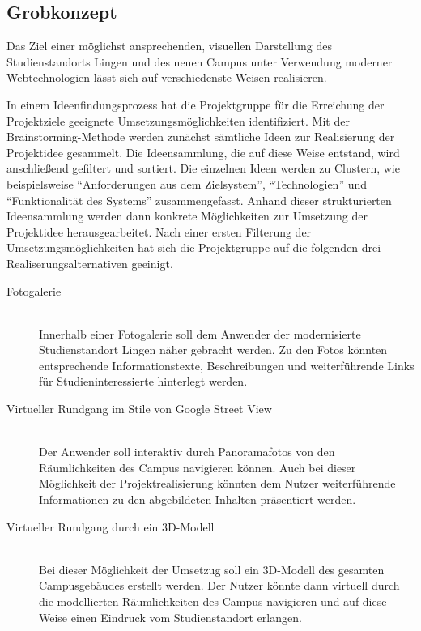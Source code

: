 \subsection{Grobkonzept}
\label{sec:Grobkonzept}

Das Ziel einer möglichst ansprechenden, visuellen Darstellung des
Studienstandorts Lingen und des neuen Campus unter Verwendung moderner
Webtechnologien lässt sich auf verschiedenste Weisen realisieren. 

In einem Ideenfindungsprozess hat die Projektgruppe für die Erreichung der
Projektziele geeignete Umsetzungsmöglichkeiten identifiziert. Mit der
Brainstorming-Methode werden zunächst sämtliche Ideen zur Realisierung der
Projektidee gesammelt. Die Ideensammlung, die auf diese Weise entstand, wird
anschließend gefiltert und sortiert. Die einzelnen Ideen werden zu Clustern, wie
beispielsweise "`Anforderungen aus dem Zielsystem"', "`Technologien"' und
"`Funktionalität des Systems"' zusammengefasst. Anhand dieser strukturierten
Ideensammlung werden dann konkrete Möglichkeiten zur Umsetzung der Projektidee
herausgearbeitet. Nach einer ersten Filterung der Umsetzungsmöglichkeiten hat
sich die Projektgruppe auf die folgenden drei Realiserungsalternativen geeinigt. 

\begin{description}
\item[Fotogalerie] \hfill \\
Innerhalb einer Fotogalerie soll dem Anwender der modernisierte Studienstandort
Lingen näher gebracht werden. Zu den Fotos könnten entsprechende
Informationstexte, Beschreibungen und weiterführende Links für
Studieninteressierte hinterlegt werden.

\item[Virtueller Rundgang im Stile von Google Street View] \hfill \\
Der Anwender soll interaktiv durch Panoramafotos von den Räumlichkeiten des
Campus navigieren können. Auch bei dieser Möglichkeit der Projektrealisierung
könnten dem Nutzer weiterführende Informationen zu den abgebildeten Inhalten
präsentiert werden.

\item[Virtueller Rundgang durch ein 3D-Modell] \hfill \\
Bei dieser Möglichkeit der Umsetzug soll ein 3D-Modell des gesamten
Campusgebäudes erstellt werden. Der Nutzer könnte dann virtuell durch die
modellierten Räumlichkeiten des Campus navigieren und auf diese Weise einen
Eindruck vom Studienstandort erlangen.
\end{description}

